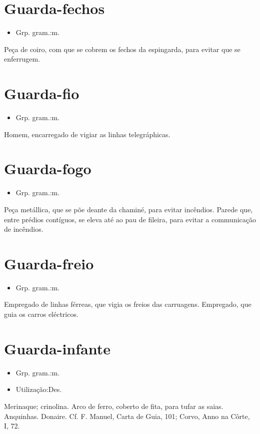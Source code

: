\section{Guarda-fechos}
\begin{itemize}
\item {Grp. gram.:m.}
\end{itemize}
Peça de coiro, com que se cobrem os fechos da espingarda, para evitar que se enferrugem.
\section{Guarda-fio}
\begin{itemize}
\item {Grp. gram.:m.}
\end{itemize}
Homem, encarregado de vigiar as linhas telegráphicas.
\section{Guarda-fogo}
\begin{itemize}
\item {Grp. gram.:m.}
\end{itemize}
Peça metállica, que se põe deante da chaminé, para evitar incêndios.
Parede que, entre prédios contíguos, se eleva até ao pau de fileira, para evitar a communicação de incêndios.
\section{Guarda-freio}
\begin{itemize}
\item {Grp. gram.:m.}
\end{itemize}
Empregado de linhas férreas, que vigia os freios das carruagens.
Empregado, que guia os carros eléctricos.
\section{Guarda-infante}
\begin{itemize}
\item {Grp. gram.:m.}
\end{itemize}
\begin{itemize}
\item {Utilização:Des.}
\end{itemize}
Merinaque; crinolina.
Arco de ferro, coberto de fita, para tufar as saias.
Anquinhas.
Donaire. Cf. F. Manuel, \textunderscore Carta de Guia\textunderscore , 101; Corvo, \textunderscore Anno na Côrte\textunderscore , I, 72.
